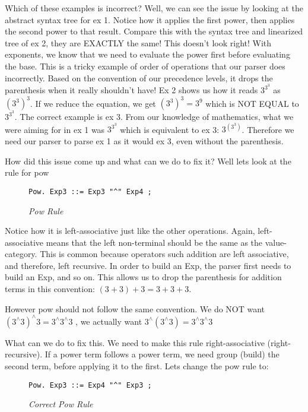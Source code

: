 \documentclass{article}
\begin{document}
\noindent
Which of these examples is incorrect? Well, we can see the issue by looking at the abstract syntax tree for ex 1. Notice how it applies the first power, then applies the second power to that result. Compare this with the syntax tree and linearized tree of ex 2, they are EXACTLY the same! This doesn't look right! With exponents, we know that we need to evaluate the power first before evaluating the base. This is a tricky example of order of operations that our parser does incorrectly. Based on the convention of our precedence levels, it drops the parenthesis when it really shouldn't have! Ex 2 shows us how it reads $3^{3^3}$ as $(3^3)^3$. If we reduce the equation, we get $(3^3)^3 = 3 ^9$ which is NOT EQUAL to $3^{3^3}$. The correct example is ex 3. From our knowledge of mathematics, what we were aiming for in ex 1 was $3^{3^3}$ which is equivalent to ex 3:  $3^{(3^3)}$. Therefore we need our parser to parse ex 1 as it would ex 3, even without the parenthesis. 

\medskip\noindent
How did this issue come up and what can we do to fix it? Well lets look at the rule for pow 
\begin{figure}[H]
    \begin{lstlisting}
Pow. Exp3 ::= Exp3 "^" Exp4 ;
    \end{lstlisting}
    \caption{\textit{Pow Rule}}
\end{figure}

\noindent
Notice how it is left-associative just like the other operations. Again, left-associative means that the left non-terminal should be the same as the value-category. This is common because operators such addition are left associative, and therefore, left recursive. In order to build an Exp, the parser first needs to build an Exp, and so on\cite{IPL}. This allows us to drop the parenthesis for addition terms in this convention: $(3 + 3) + 3 = 3 + 3 + 3$. 

\medskip\noindent
However pow should not follow the same convention. We do NOT want $(3^\wedge 3)^\wedge 3 = 3^\wedge 3^\wedge 3$ , we actually want $3^\wedge (3^\wedge 3) = 3^\wedge 3^\wedge 3$

\medskip\noindent
What can we do to fix this. We need to make this rule right-associative (right-recursive). If a power term follows a power term, we need group (build) the second term, before applying it to the first. Lets change the pow rule to:
\begin{figure}[H]
    \begin{lstlisting}
Pow. Exp3 ::= Exp4 "^" Exp3 ;
    \end{lstlisting}
    \caption{\textit{Correct Pow Rule}}
\end{figure}
\end{document}
